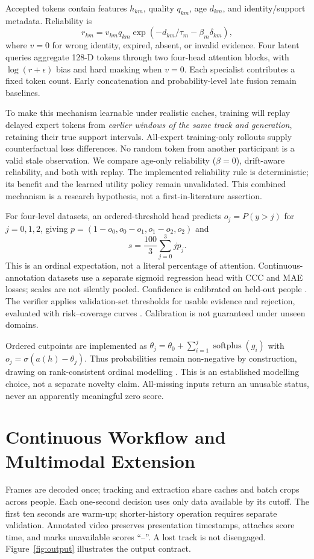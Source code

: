 \documentclass[a4paper,conference]{IEEEtran}
\begin{document}
Accepted tokens contain features $h_{km}$, quality $q_{km}$, age $d_{km}$, and identity/support metadata. Reliability is
\begin{equation}
r_{km}=v_{km}q_{km}\exp(-d_{km}/\tau_m-\beta_m\delta_{km}),
\end{equation}
where $v=0$ for wrong identity, expired, absent, or invalid evidence. Four latent queries aggregate 128-D tokens through two four-head attention blocks, with $\log(r+\epsilon)$ bias and hard masking when $v=0$. Each specialist contributes a fixed token count. Early concatenation and probability-level late fusion remain baselines.

To make this mechanism learnable under realistic caches, training will replay delayed expert tokens from \emph{earlier windows of the same track and generation}, retaining their true support intervals. All-expert training-only rollouts supply counterfactual loss differences. No random token from another participant is a valid stale observation. We compare age-only reliability ($\beta=0$), drift-aware reliability, and both with replay. The implemented reliability rule is deterministic; its benefit and the learned utility policy remain unvalidated. This combined mechanism is a research hypothesis, not a first-in-literature assertion.

For four-level datasets, an ordered-threshold head predicts $o_j=P(y>j)$ for $j=0,1,2$, giving $p=(1-o_0,o_0-o_1,o_1-o_2,o_2)$ and
\begin{equation}
s=\frac{100}{3}\sum_{j=0}^{3}jp_j.
\end{equation}
This is an ordinal expectation, not a literal percentage of attention. Continuous-annotation datasets use a separate sigmoid regression head with CCC and MAE losses; scales are not silently pooled. Confidence is calibrated on held-out people \cite{guo}. The verifier applies validation-set thresholds for usable evidence and rejection, evaluated with risk--coverage curves \cite{selective}. Calibration is not guaranteed under unseen domains.

Ordered cutpoints are implemented as $\theta_j=\theta_0+\sum_{i=1}^{j}\operatorname{softplus}(g_i)$ with $o_j=\sigma(a(h)-\theta_j)$. Thus probabilities remain non-negative by construction, drawing on rank-consistent ordinal modelling \cite{coral}. This is an established modelling choice, not a separate novelty claim. All-missing inputs return an unusable status, never an apparently meaningful zero score.

\section{Continuous Workflow and Multimodal Extension}
Frames are decoded once; tracking and extraction share caches and batch crops across people. Each one-second decision uses only data available by its cutoff. The first ten seconds are warm-up; shorter-history operation requires separate validation. Annotated video preserves presentation timestamps, attaches score time, and marks unavailable scores ``--''. A lost track is not disengaged. Figure~\ref{fig:output} illustrates the output contract.
\end{document}
